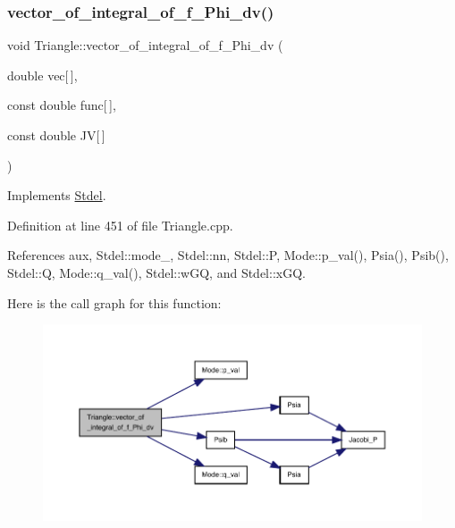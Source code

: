 \subsubsection{\texorpdfstring{vector\+\_\+of\+\_\+integral\+\_\+of\+\_\+f\+\_\+\+Phi\+\_\+dv()}{vector\_of\_integral\_of\_f\_Phi\_dv()}\hspace{0.1cm}{\footnotesize\ttfamily [1/2]}}
{\footnotesize\ttfamily void Triangle\+::vector\+\_\+of\+\_\+integral\+\_\+of\+\_\+f\+\_\+\+Phi\+\_\+dv (\begin{DoxyParamCaption}\item[{double}]{vec\mbox{[}$\,$\mbox{]},  }\item[{const double}]{func\mbox{[}$\,$\mbox{]},  }\item[{const double}]{JV\mbox{[}$\,$\mbox{]} }\end{DoxyParamCaption})\hspace{0.3cm}{\ttfamily [virtual]}}



Implements \hyperlink{classStdel_aa5ef347c02106753c2d3961b59a7309e}{Stdel}.



Definition at line 451 of file Triangle.\+cpp.



References aux, Stdel\+::mode\+\_\+, Stdel\+::nn, Stdel\+::P, Mode\+::p\+\_\+val(), Psia(), Psib(), Stdel\+::Q, Mode\+::q\+\_\+val(), Stdel\+::w\+GQ, and Stdel\+::x\+GQ.

Here is the call graph for this function\+:
\nopagebreak
\begin{figure}[H]
\begin{center}
\leavevmode
\includegraphics[width=350pt]{classTriangle_afc023a739048c1294b8417bfec3afb7a_cgraph}
\end{center}
\end{figure}
\mbox{\label{classTriangle_acc741aa9440446498e212d00cff284e8}} 
